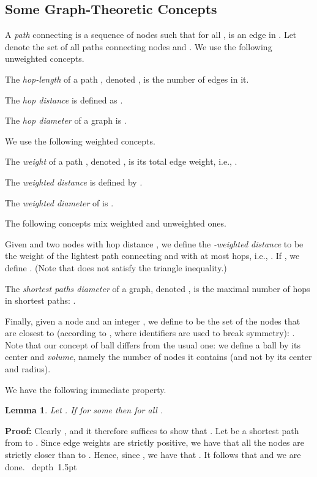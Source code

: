 \documentclass[letterpaper,11pt]{article}
\newtheorem{lemma}[theorem]{Lemma}
\newcommand{\blackslug}{\hbox{\hskip 1pt \vrule width 4pt height 8pt
depth 1.5pt \hskip 1pt}}
\newcommand{\QED}{\quad\blackslug\lower 8.5pt\null\par}
\newenvironment{proof}[1][Proof:]{\noindent \textbf{#1}\xspace}{\QED}
\begin{document}
\subsection{Some Graph-Theoretic Concepts} 
A \emph{path}  connecting
 is a sequence of nodes
 such that for
all ,  is an edge in . 
Let  denote  the set of all paths
connecting nodes  and .  We use the following unweighted concepts.
\begin{compactitem}
\item The \emph{hop-length} of a path , denoted
,  is the number of
edges in it.
\item The \emph{hop distance}  is defined as
.
\item The \emph{hop diameter} of a graph  is
.
\end{compactitem}
We use the following weighted concepts.
\begin{compactitem}
\item The \emph{weight} of a path , denoted , is its total
edge weight, i.e., .
\item The \emph{weighted distance} 
is defined by .
\item The \emph{weighted diameter} of  is
.
\end{compactitem}
The following concepts mix weighted and unweighted ones.
\begin{compactitem}
\item Given  and two nodes  with hop
  distance , we define the \emph{-weighted
    distance}  to be the weight of the lightest path
  connecting  and  with at most  hops, i.e.,
  . If , we define .
  (Note that   does not satisfy the
  triangle inequality.)
\item The \emph{shortest paths diameter} of a graph, denoted ,
  is the maximal number of 
    hops in shortest paths:
    .
\end{compactitem}

Finally, given a node  and an integer , we define  to be
the set  of the  nodes that are closest to  (according to , where
identifiers are used to break symmetry): . Note
that our concept of ball differs from the usual one: we define a ball by its
center and \emph{volume}, namely the number of nodes it contains (and not by its
center and radius).

We have the following immediate property.
\begin{lemma}
\label{lem:h}
Let . If  for some 
then  for all
.
\end{lemma}
\begin{proof}
Clearly , and it therefore suffices to
show that . Let  be a
shortest path from  to . Since edge weights are strictly positive, we have
that all the  nodes  are strictly closer than  to .
Hence, since , we have that . It follows that
 and we are done.
\end{proof}
\end{document}
